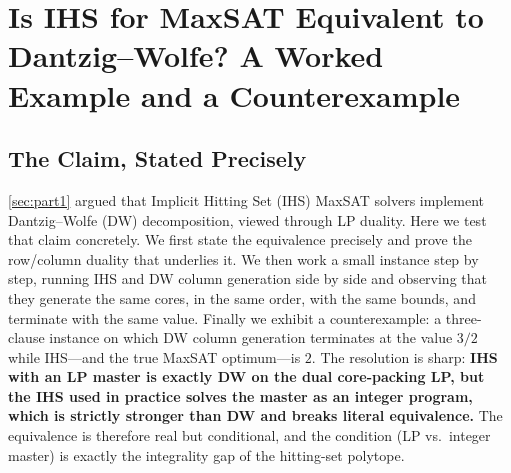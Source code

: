 \section{Is IHS for MaxSAT Equivalent to Dantzig--Wolfe? A Worked Example and a Counterexample}
\label{sec:part2}

\subsection{The Claim, Stated Precisely}
\label{sec:claim}

\cref{sec:part1} argued that Implicit Hitting Set (IHS) MaxSAT solvers
implement Dantzig--Wolfe (DW) decomposition, viewed through LP duality. Here we
test that claim concretely. We first state the equivalence precisely and prove
the row/column duality that underlies it. We then work a small instance step by
step, running IHS and DW column generation side by side and observing that they
generate the same cores, in the same order, with the same bounds, and terminate
with the same value. Finally we exhibit a counterexample: a three-clause
instance on which DW column generation terminates at the value $3/2$ while
IHS---and the true MaxSAT optimum---is $2$. The resolution is sharp: \textbf{IHS
with an LP master is exactly DW on the dual core-packing LP, but the IHS used in
practice solves the master as an integer program, which is strictly stronger than
DW and breaks literal equivalence.} The equivalence is therefore real but
conditional, and the condition (LP vs.\ integer master) is exactly the
integrality gap of the hitting-set polytope.

